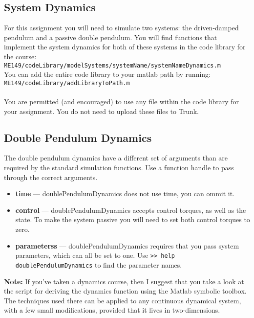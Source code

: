\subsection*{System Dynamics}

For this assignment you will need to simulate two systems:
the driven-damped pendulum and a passive double pendulum.
You will find functions that implement the system dynamics for both of these systems
in the code library for the course:\\
\texttt{ME149/codeLibrary/modelSystems/systemName/systemNameDynamics.m}\\
You can add the entire code library to your matlab path by running:\\
\texttt{ME149/codeLibrary/addLibraryToPath.m}\\
\\
You are permitted (and encouraged) to use any file
within the code library for your assignment.
You do not need to upload these files to Trunk.

\subsection*{Double Pendulum Dynamics}

The double pendulum dynamics have a different set of arguments
than are required by the standard simulation functions.
Use a function handle to pass through the correct arguments.

\vspace{-0.6em} \begin{itemize}  \setlength\itemsep{0em}
  \item \textbf{time} --- doublePendulumDynamics does not use time, you can ommit it.
  \item \textbf{control} --- doublePendulumDynamics accepts control torques, as well as the state.
    To make the system passive you will need to set both control torques to zero.
  \item \textbf{parameterss} --- doublePendulumDynamics requires that you pass system parameters,
    which can all be set to one. Use \texttt{>> help doublePendulumDynamics} to find the parameter names.
\end{itemize}

\textbf{Note:} If you've taken a dynamics course,
then I suggest that you take a look at the
script for deriving the dynamics function using the Matlab symbolic toolbox.
The techniques used there can be applied to any continuous dynamical system,
with a few small modifications, provided that it lives in two-dimensions.

